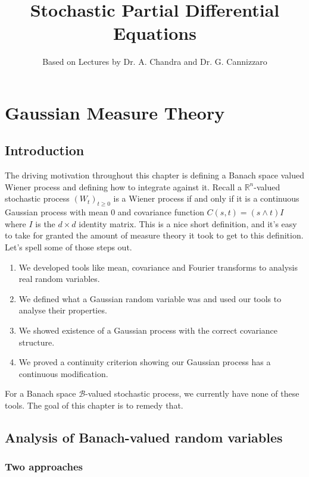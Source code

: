 \documentclass[fontsize=12pt, DIV=12]{scrreprt}
\title{Stochastic Partial Differential Equations}
\author{Based on Lectures by Dr. A. Chandra and Dr. G. Cannizzaro}
\newcommand{\R}{\mathbb R}
\newcommand{\calB}{\mathcal B}
\begin{document}
\maketitle

\tableofcontents

\chapter{Gaussian Measure Theory}

\section{Introduction}

The driving motivation throughout this chapter is defining a Banach space valued Wiener process and defining how to integrate against it. Recall a $\R^n$-valued stochastic process $(W_t)_{t \geq 0}$ is a Wiener process if and only if it is a continuous Gaussian process with mean 0 and covariance function $C(s, t) = (s \wedge t) I$ where $I$ is the $d \times d$ identity matrix. This is a nice short definition, and it's easy to take for granted the amount of measure theory it took to get to this definition. Let's spell some of those steps out.
\begin{enumerate}
	\item We developed tools like mean, covariance and Fourier transforms to analysis real random variables.
	\item We defined what a Gaussian random variable was and used our tools to analyse their properties.
	\item We showed existence of a Gaussian process with the correct covariance structure.
	\item We proved a continuity criterion showing our Gaussian process has a continuous modification.
\end{enumerate}
For a Banach space $\calB$-valued stochastic process, we currently have none of these tools. The goal of this chapter is to remedy that.

\section{Analysis of Banach-valued random variables}

\subsection{Two approaches}
\end{document}
